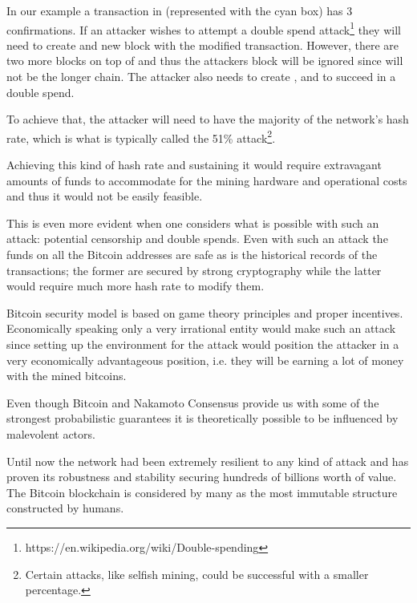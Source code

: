 In our example a transaction in  (represented with the cyan box) has 3 confirmations. If an attacker wishes to attempt a double spend attack\footnote{https://en.wikipedia.org/wiki/Double-spending} they will need to create and new  block with the modified transaction. However, there are two more blocks on top of  and thus the attackers block will be ignored since  will not be the longer chain. The attacker also needs to create ,  and  to succeed in a double spend. 

To achieve that, the attacker will need to have the majority of the network's hash rate, which is what is typically called the 51\% attack\footnote{Certain attacks, like selfish mining, could be successful with a smaller percentage.}.

Achieving this kind of hash rate and sustaining it would require extravagant amounts of funds to accommodate for the mining hardware and operational costs and thus it would not be easily feasible. 

This is even more evident when one considers what is possible with such an attack: potential censorship and double spends. Even with such an attack the funds on all the Bitcoin addresses are safe as is the historical records of the transactions; the former are secured by strong cryptography while the latter would require much more hash rate to modify them.

Bitcoin security model is based on game theory principles and proper incentives. Economically speaking only a very irrational entity would make such an attack since setting up the environment for the attack would position the attacker in a very economically advantageous position, i.e. they will be earning a lot of money with the mined bitcoins.

\begin{note}
Even though Bitcoin and Nakamoto Consensus provide us with some of the strongest probabilistic guarantees it is theoretically possible to be influenced by malevolent actors. 
\end{note}

Until now the network had been extremely resilient to any kind of attack and has proven its robustness and stability securing hundreds of billions worth of value. The Bitcoin blockchain is considered by many as the most immutable structure constructed by humans.


